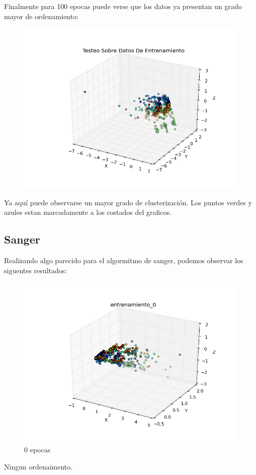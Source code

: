 Finalmente para 100 epocas puede verse que los datos ya presentan un grado mayor de ordenamiento:

\begin{figure}[h!]
	\centering
	\includegraphics[width=.6\linewidth]{img/convergencia_oja/entrenamiento_100.png}
	\label{fig:test1}
	\centering
\end{figure}

Ya aquí puede observarse un mayor grado de clusterización. Los puntos verdes y azules estan marcadamente a los costados del graficos.

\pagebreak

\subsection{Sanger}

Realizando algo parecido para el algormitmo de sanger, podemos observar los siguentes resultados:

\begin{figure}[h!]
  \centering
  \includegraphics[width=.6\linewidth]{img/convergencia_sanger/entrenamiento_0.png}
\caption{0 epocas}
\label{fig:test}
\end{figure}

Ningun ordenaimento.

